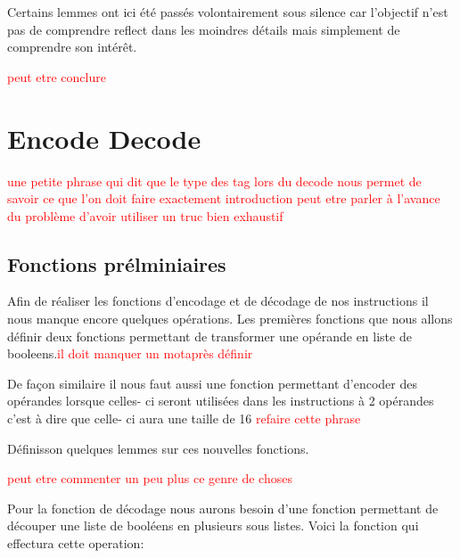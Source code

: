 \documentclass {article}
\newcommand{\codefrom}[3]
           {}
\theoremstyle{definition}
\theoremstyle{remark}
\newcommand{\todo}[1]{\textcolor{red}{#1}}
\begin{document}
\codefrom{src}{association_list}{lookup_lookdown}

\codefrom{src}{association_list}{lookup_lookdown_script}

Certains lemmes ont ici été passés volontairement sous silence car l'objectif n'est pas
de comprendre reflect dans les moindres détails mais simplement de comprendre son intérêt.

\todo{peut etre conclure}


\section{Encode Decode}
\label{Encode Decode}

\todo{une petite phrase qui dit que le type des tag lors du decode nous permet de savoir ce que l'on doit faire exactement}
\todo{introduction peut etre parler à l'avance du problème d'avoir utiliser un truc bien exhaustif}



\subsection{Fonctions prélminiaires}

Afin de réaliser les fonctions d'encodage et de décodage de nos instructions il nous manque encore quelques opérations.
Les premières fonctions que nous allons définir deux fonctions permettant de transformer une opérande en liste de booleens.\todo{il doit manquer un motaprès définir}

\codefrom{src}{encode}{operand_to_bin}

De façon similaire il nous faut aussi une fonction permettant d'encoder des opérandes lorsque celles- ci seront utilisées dans
les instructions à 2 opérandes c'est à dire que celle- ci aura une taille de 16 \todo{refaire cette phrase}

\codefrom{src}{encode}{operand_to_bin_double}

Définisson quelques lemmes sur ces nouvelles fonctions.
\codefrom{src}{encode}{operand_to_bin_hypothesis_reg}
\codefrom{src}{encode}{operand_to_bin_hypothesis_imm}
\codefrom{src}{encode}{operand_to_bin_size}
\todo{peut etre commenter un peu plus ce genre de choses}


Pour la fonction de décodage nous aurons besoin d'une fonction permettant de découper
une liste de booléens en plusieurs sous listes. Voici la fonction qui effectura cette operation:
\end{document}

